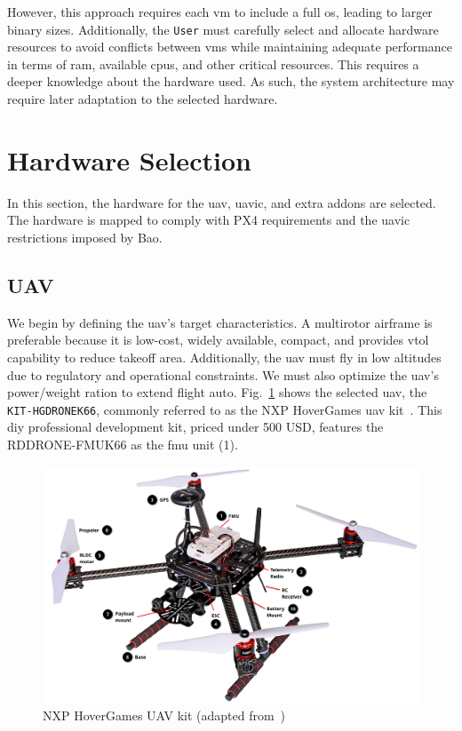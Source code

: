 However, this approach requires each \gls{vm} to include a full \gls{os},
leading to larger binary sizes. Additionally, the \lstinline{User} must carefully
select and allocate hardware resources to avoid conflicts between \glspl{vm}
while maintaining adequate performance in terms of \gls{ram}, available
\glspl{cpu}, and other critical resources. This requires a deeper knowledge
about the hardware used. As such, the system architecture may require later
adaptation to the selected hardware.

\section{Hardware Selection}
\label{sec:hardware-selection}
In this section, the hardware for the \gls{uav}, \gls{uavic}, and
extra addons are selected. The hardware is mapped to comply with PX4
requirements and the \gls{uavic} restrictions imposed by Bao.

\subsection{UAV}
\label{sec:uav-hw-sel}
We begin by defining the \gls{uav}'s target characteristics. A multirotor
airframe is preferable because it is low-cost, widely available, compact, and
provides \gls{vtol} capability to reduce takeoff area.
Additionally, the
\gls{uav} must fly in low altitudes due to regulatory and operational
constraints. We must also optimize the \gls{uav}'s power/weight ration to extend
flight auto.
%
Fig.~\ref{fig:hoverGames-drone} shows the selected \gls{uav}, the
\lstinline{KIT-HGDRONEK66}, commonly referred to as the NXP HoverGames \gls{uav}
kit~\cite{nxp-hoverGames-uav}. This \gls{diy} professional development kit,
priced under 500 USD, features the RDDRONE-FMUK66 as the \gls{fmu} unit (1).

\begin{figure}[!hbt]
  \centering
  \includegraphics[width=1.0\textwidth]{./img/pdf/hoverGames-drone.pdf} 
  \caption[NXP HoverGames UAV kit]{NXP HoverGames UAV kit (adapted from~\cite{nxp-hoverGames-uav})\footnotemark}%
  \label{fig:hoverGames-drone}
\end{figure}
%

